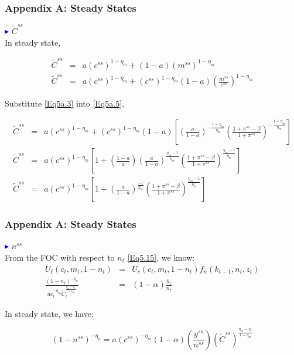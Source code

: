 \begin{frame}
\frametitle{Appendix A: Steady States} \vskip 0.1in

\textcolor{blue}{$\blacktriangleright$} $\tilde{C}^{ss}$\\

In steady state,

\begin{eqnarray}
\tilde{C}^{ss} &=& a (c^{ss})^{1-\eta_{m}}+
(1-a)(m^{ss})^{1-\eta_{m}}
\label{Eq5a.4}\\
\tilde{C}^{ss} &=& a (c^{ss})^{1-\eta_{m}}+ (c^{ss})^{1-\eta_{m}}
(1-a)(\frac{m^{ss}}{c^{ss}})^{1-\eta_{m}} \label{Eq5a.5}
\end{eqnarray}

Substitute \eqref{Eq5a.3} into \eqref{Eq5a.5},

{\scriptsize{
\begin{eqnarray}
\tilde{C}^{ss} &=& a (c^{ss})^{1-\eta_{m}}+ (c^{ss})^{1-\eta_{m}}
(1-a)[(\frac{a}{1-a})^{-\frac{1-\eta_{m}}{\eta_{m}}}
(\frac{1+\pi^{ss}-\beta}{1+\pi^{ss}})^{-\frac{1-\eta_{m}}{\eta_{m}}}] \label{Eq5a.6}\\
\tilde{C}^{ss} &=& a (c^{ss})^{1-\eta_{m}}[1+(\frac{1-a}{a})
(\frac{a}{1-a})^{\frac{\eta_{m}-1}{\eta_{m}}}
(\frac{1+\pi^{ss}-\beta}{1+\pi^{ss}})^{\frac{\eta_{m}-1}{\eta_{m}}}] \label{Eq5a.7}\\
\tilde{C}^{ss} &=& a (c^{ss})^{1-\eta_{m}}[1+
(\frac{a}{1-a})^{\frac{-1}{\eta_{m}}}
(\frac{1+\pi^{ss}-\beta}{1+\pi^{ss}})^{\frac{\eta_{m}-1}{\eta_{m}}}]
\label{Eq5a.8}
\end{eqnarray}}}

\end{frame}


\begin{frame}
\frametitle{Appendix A: Steady States} \vskip 0.1in

\textcolor{blue}{$\blacktriangleright$} $n^{ss}$\\

From the FOC with respect to $n_{t}$ \eqref{Eq5.15}, we know:
\begin{eqnarray}
U_{\ell}(c_{t},m_{t},1-n_{t}) &=&
U_{c}(c_{t},m_{t},1-n_{t})f_{n}(k_{t-1},n_{t},z_{t})
\label{Eq5a.9}\\
\frac{(1-n_{t})^{-\eta_{n}}}{a c_{t}^{-\eta_{m}}
\tilde{C}_{t}^{\frac{\eta_{m}-\eta_{c}}{1-\eta_{m}}}} &=&
(1-\alpha)\frac{y_{t}}{n_{t}}\label{Eq5a.10}
\end{eqnarray}

In steady state, we have:

\begin{equation}\label{Eq5a.11}
(1-n^{ss})^{-\eta_{n}}=a
(c^{ss})^{-\eta_{m}}(1-\alpha)(\frac{y^{ss}}{n^{ss}})(\tilde{C}^{ss})^{\frac{\eta_{m}-\eta_{c}}{1-\eta_{m}}}
\end{equation}

\end{frame}

